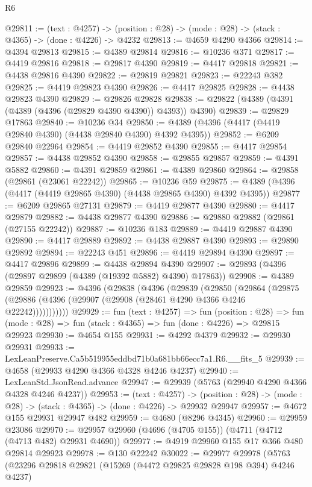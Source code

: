 \begin{lexlean}{R6}
\begin{coremodule}
@29811 := (text : @4257) ->
  (position : @28) -> (mode : @28) -> (stack : @4365) -> (done : @4226) -> @4232
@29813 := @4659 @4290 @4366
@29814 := @4394 @29813
@29815 := @4389 @29814
@29816 := @10236 @371
@29817 := @4419 @29816
@29818 := @29817 @4390
@29819 := @4417 @29818
@29821 := @4438 @29816 @4390
@29822 := @29819 @29821
@29823 := @22243 @382
@29825 := @4419 @29823 @4390
@29826 := @4417 @29825
@29828 := @4438 @29823 @4390
@29829 := @29826 @29828
@29838 := @29822 (@4389 (@4391 (@4389 (@4396 (@29829 @4390 @4390)) @4393)) @4390)
@29839 := @29829 @17863
@29840 := @10236 @34
@29850 := @4389 (@4396 (@4417 (@4419 @29840 @4390) (@4438 @29840 @4390) @4392 @4395))
@29852 := @6209 @29840 @22964
@29854 := @4419 @29852 @4390
@29855 := @4417 @29854
@29857 := @4438 @29852 @4390
@29858 := @29855 @29857
@29859 := @4391 @5882
@29860 := @4391 @29859
@29861 := @4389 @29860
@29864 := @29858 (@29861 (@23061 @22242))
@29865 := @10236 @59
@29875 := @4389 (@4396 (@4417 (@4419 @29865 @4390) (@4438 @29865 @4390) @4392 @4395))
@29877 := @6209 @29865 @27131
@29879 := @4419 @29877 @4390
@29880 := @4417 @29879
@29882 := @4438 @29877 @4390
@29886 := @29880 @29882 (@29861 (@27155 @22242))
@29887 := @10236 @183
@29889 := @4419 @29887 @4390
@29890 := @4417 @29889
@29892 := @4438 @29887 @4390
@29893 := @29890 @29892
@29894 := @22243 @451
@29896 := @4419 @29894 @4390
@29897 := @4417 @29896
@29899 := @4438 @29894 @4390
@29907 := @29893 (@4396 (@29897 @29899 (@4389 (@19392 @5882) @4390) @17863))
@29908 := @4389 @29859
@29923 := @4396
    (@29838
      (@4396
        (@29839
          (@29850
            (@29864
              (@29875 (@29886 (@4396 (@29907 (@29908 (@28461 @4290 @4366 @4246 @22242)))))))))))
@29929 := fun (text : @4257) =>
  fun (position : @28) =>
  fun (mode : @28) => fun (stack : @4365) => fun (done : @4226) => @29815 @29923
@29930 := @4654 @155
@29931 := @4292 @4379
@29932 := @29930 @29931
@29933 := LexLeanPreserve.Ca5b519955eddbd71b0a681bb66ecc7a1.R6.__fits_5
@29939 := @4658 (@29933 @4290 @4366 @4328 @4246 @4237)
@29940 := LexLeanStd.JsonRead.advance
@29947 := @29939 (@5763 (@29940 @4290 @4366 @4328 @4246 @4237))
@29953 := (text : @4257) ->
  (position : @28) -> (mode : @28) -> (stack : @4365) -> (done : @4226) -> @29932 @29947
@29957 := @4672 @155 @29931 @29947 @482
@29959 := @4680 (@8296 @4345)
@29960 := @29959 @23086
@29970 := @29957 @29960 (@4696 (@4705 @155)) (@4711 (@4712 (@4713 @482) @29931 @4690))
@29977 := @4919 @29960 @155 @17 @366 @480 @29814 @29923
@29978 := @130 @22242
@30022 := @29977
    @29978
    (@5763
      (@23296
        @29818
        @29821
        (@15269 (@4472 @29825 @29828 @198 @394) @4246 @4237)

\end{coremodule}
\end{lexlean}
